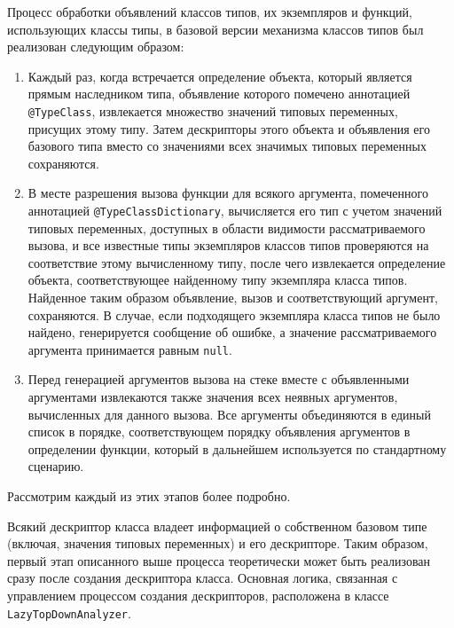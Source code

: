 Процесс обработки объявлений классов типов, их экземпляров и функций, использующих классы типы, в базовой версии механизма классов типов был реализован следующим образом:  
\begin{enumerate}
    \item Каждый раз, когда встречается определение объекта, который является  прямым наследником типа, объявление которого помечено аннотацией \lstinline{@TypeClass}, извлекается множество значений типовых переменных, присущих этому типу. Затем дескрипторы этого объекта и объявления его базового типа вместо со значениями всех значимых типовых переменных сохраняются. 
    \item В месте разрешения вызова функции для всякого аргумента, помеченного аннотацией \lstinline{@TypeClassDictionary}, вычисляется его тип с учетом значений типовых переменных, доступных в области видимости рассматриваемого вызова, и все известные типы экземпляров классов типов проверяются на соответствие этому вычисленному типу, после чего извлекается определение объекта, соответствующее найденному типу экземпляра класса типов. Найденное таким образом объявление, вызов и соответствующий аргумент, сохраняются. В случае, если подходящего экземпляра класса типов не было найдено, генерируется сообщение об ошибке, а значение рассматриваемого аргумента принимается равным \lstinline{null}. 
    \item Перед генерацией аргументов вызова на стеке вместе с объявленными аргументами извлекаются также значения всех неявных аргументов, вычисленных для данного вызова. Все аргументы объединяются в единый список в порядке, соответствующем порядку объявления аргументов в определении функции, который в дальнейшем используется по стандартному сценарию.    
\end{enumerate}   
Рассмотрим каждый из этих этапов более подробно.

Всякий дескриптор класса владеет информацией о собственном базовом типе (включая, значения типовых переменных) и его дескрипторе. Таким образом, первый этап описанного выше процесса теоретически может быть реализован сразу после создания дескриптора класса. Основная логика, связанная с управлением процессом создания дескрипторов, расположена в классе \lstinline{LazyTopDownAnalyzer}. 

